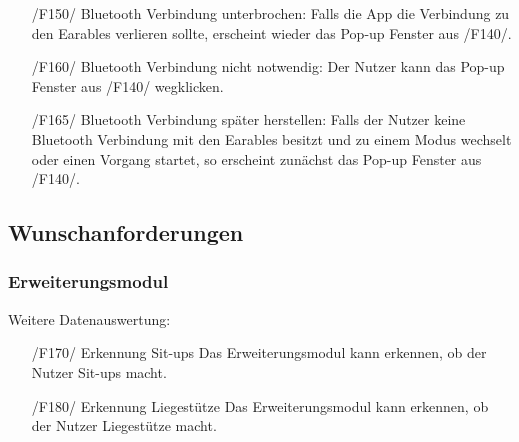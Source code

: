 \documentclass[a4paper,12pt]{article}
\begin{document}
\begin{itemize}
      \item[/F150/] \textsf{Bluetooth Verbindung unterbrochen:} Falls die App die Verbindung zu den \gls{Earables} verlieren sollte, erscheint wieder das Pop-up Fenster aus /F140/.
      \item[/F160/] \textsf{Bluetooth Verbindung nicht notwendig:} Der Nutzer kann das Pop-up Fenster aus /F140/ wegklicken.
      \item[/F165/] \textsf{Bluetooth Verbindung später herstellen:} Falls der Nutzer keine Bluetooth Verbindung mit den \gls{Earables} besitzt und zu einem Modus wechselt oder einen Vorgang startet, so erscheint zunächst das Pop-up Fenster aus /F140/.
    \end{itemize}
  \subsection{Wunschanforderungen}
    \subsubsection{Erweiterungsmodul}
      \textsf{Weitere Datenauswertung:}
      \begin{itemize}
      \item[/F170/] \textsf{Erkennung Sit-ups} Das Erweiterungsmodul kann erkennen, ob der Nutzer Sit-ups macht.
      \item[/F180/] \textsf{Erkennung Liegestütze} Das Erweiterungsmodul kann erkennen, ob der Nutzer Liegestütze macht.
      \end{itemize} 
\end{document}
